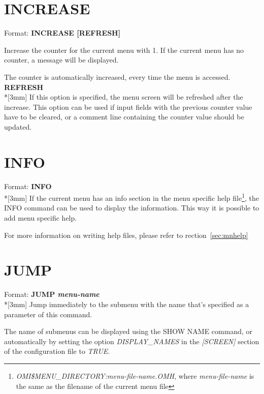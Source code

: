 \documentclass[a4paper]{book}
\renewcommand{\indent}{\hspace*{5mm}}
\begin{document}
\section{INCREASE}
\label{subsec:increase}

\indent Format: \textbf{INCREASE [REFRESH]}

\noindent Increase the counter for the current menu with 1. If the current menu has no 
counter, a message will be displayed.

The counter is automatically increased, every time the menu is accessed.\\[3mm]
\textbf{REFRESH}\\*[3mm]
If this option is specified, the menu screen will be refreshed after the 
increase. This option can be used if input fields with the previous counter 
value have to be cleared, or a comment line containing the counter value 
should be updated.

\section{INFO}
\label{subsec:cmdinfo}

\indent Format: \textbf{INFO}\\*[3mm]
If the current menu has an info section in the menu specific help
file\footnote{ \textsl{OMI\$MENU\_DIRECTORY:\textit{menu-file-name}.OMH}, 
where \textit{menu-file-name} is the same as the filename of the current menu file}, the
\textsf{INFO} command can be used to display the information. This way it is possible to add menu specific help.

For more information on writing help files, please refer to rection~\ref{sec:mnhelp}

\section{JUMP}
\label{subsec:mylabel16}

\indent Format: \textbf{JUMP \textit{menu-name}}\dag\\*[3mm]
Jump immediately to the submenu with the name that's specified as a 
parameter of this command.

The name of submenus can be displayed using the
\textsf{SHOW NAME}
command, or automatically by setting the option \textsl{DISPLAY{\_}NAMES} in the
\textsl{[SCREEN]}
section of the configuration file to \textsl{TRUE}.
\end{document}
